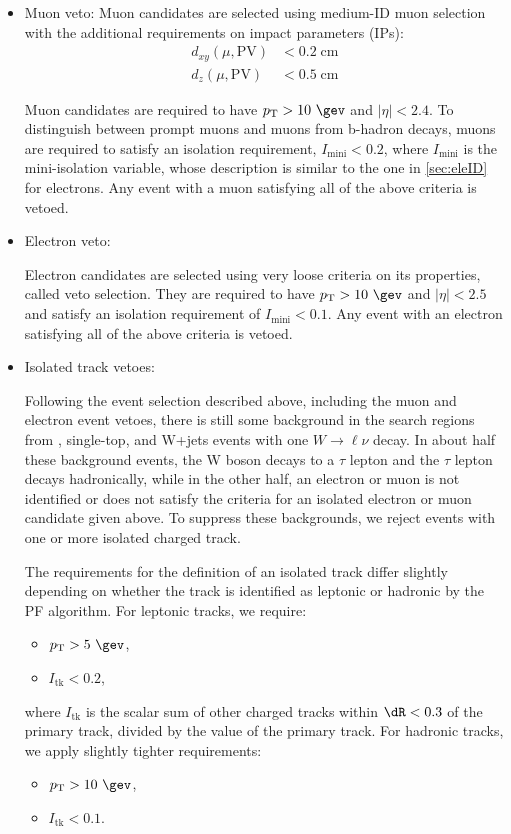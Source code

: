 \begin{itemize}
\item Muon veto:
  Muon candidates are selected using
  medium-ID muon selection \cite{Sirunyan:2018fpa} with the additional
  requirements on impact parameters (IPs):
  \begin{align}
    d_{xy}(\mu,\mathrm{PV}) &< 0.2\;\mathrm{cm}\nonumber\\
    d_{z}(\mu,\mathrm{PV}) &< 0.5\;\mathrm{cm}
  \end{align}

  Muon candidates are required to have $\pt>10\ \gev$ and $|\eta|<2.4$.
  To distinguish between prompt muons and muons from b-hadron
  decays, muons are required to satisfy an isolation requirement,
  $I_{\mathrm{mini}}<0.2$, where $I_{\mathrm{mini}}$ is the mini-isolation
  variable, whose description is similar to the one in \ref{sec:eleID} for electrons.
 Any event with a muon satisfying all of the  above criteria is vetoed.

\item Electron veto:

  Electron candidates are selected using very loose criteria on its properties, called veto selection.
  They are required to have $\pt>10\ \gev$ and $|\eta|<2.5$ and satisfy an isolation
  requirement of $I_{\mathrm{mini}}<0.1$. Any event with an electron satisfying all of the
  above criteria is vetoed.
\item Isolated track vetoes:
  
  Following the event selection described above,
  including the muon and electron event vetoes,
  there is still some background in the search regions from
  \ttbar, single-top, and W+jets events with one $W\rightarrow\ell\nu$
  decay.  In about half these background events, the W boson decays to a $\tau$ lepton
  and the $\tau$ lepton decays hadronically,
  while in the other half, an electron or muon is not identified
  or does not satisfy the criteria for an isolated electron or muon
  candidate given above.
  To suppress these backgrounds,
  we reject events with one or more isolated
  charged track.

  The requirements for the definition of an isolated track
  differ slightly depending on whether the track is identified
  as leptonic or hadronic by the PF algorithm.
  For leptonic tracks, we require:
  \begin{itemize}
  \item $\pt>5\ \gev$,
  \item $I_{\mathrm{tk}}<0.2$,
  \end{itemize}
  where $I_{\mathrm{tk}}$ is the scalar \pt sum of other
  charged tracks within $\dR<0.3$ of the primary track, divided
  by the \pt value of the primary track.
  For hadronic tracks, we apply slightly tighter requirements:
  \begin{itemize}
  \item $\pt>10\ \gev$,
  \item $I_{\mathrm{tk}}<0.1$.
  \end{itemize}


\end{itemize}
